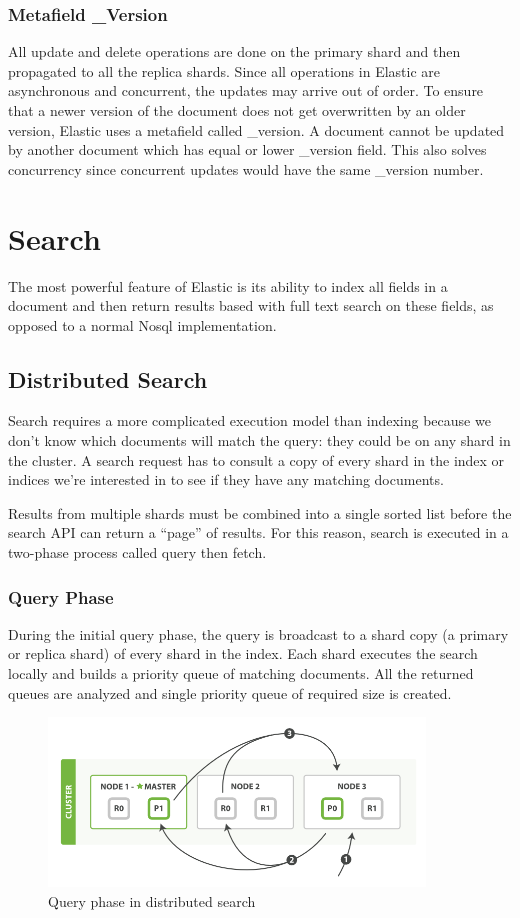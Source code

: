\documentclass[12pt]{article}
\begin{document}
			\subsubsection{Metafield \_Version}
				All update and delete operations are done on the primary shard and then propagated to all the replica shards. Since all operations in Elastic are asynchronous and concurrent, the updates may arrive out of order. To ensure that a newer version of the document does not get overwritten by an older version, Elastic uses a metafield called \_version. A document cannot be updated by another document which has equal or lower \_version field. This also solves concurrency since concurrent updates would have the same \_version number.

	\section{Search}
		The most powerful feature of Elastic is its ability to index all fields in a document and then return results based with full text search on these fields, as opposed to a normal No\ac{sql} implementation.

		\subsection{Distributed Search}
			Search requires a more complicated execution model than indexing because we don’t know which
			documents will match the query: they could be on any shard in the cluster. A search
			request has to consult a copy of every shard in the index or indices we’re interested in
			to see if they have any matching documents.
			
			Results from multiple shards must be combined into a single sorted list before the search API can return a	“page” of results. For this reason, search is executed in a two-phase process called query then fetch.

			\subsubsection{Query Phase}
			During the initial query phase, the query is broadcast to a shard copy (a primary or
			replica shard) of every shard in the index. Each shard executes the search locally and
			builds a priority queue of matching documents. All the returned queues are analyzed and single priority queue of required size is created.
				\begin{figure}[ht]
					\centering\includegraphics[width=10cm]{images/query_phase}
					\caption{Query phase in distributed search}
				\end{figure}
\end{document}
